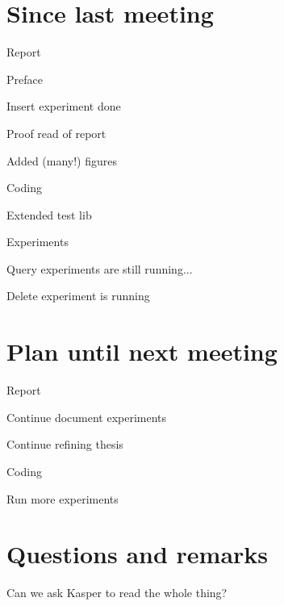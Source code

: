 \documentclass[a4paper,11pt,agenda,chair]{meetingmins}
\begin{document}
\maketitle

\section{Since last meeting}
\begin{items}
\item Report
	\begin{items}
		\item Preface
		\item Insert experiment done
		\item Proof read of report
		\item Added (many!) figures
	\end{items}
\item Coding
	\begin{items}
		\item Extended test lib
	\end{items}
\item Experiments
	\begin{items}
		\item Query experiments are still running...
		\item Delete experiment is running
	\end{items}
\end{items}

\section{Plan until next meeting}
\begin{items}
\item Report
	\begin{items}
		\item Continue document experiments
		\item Continue refining thesis
	\end{items}
\item Coding
	\begin{items}
		\item Run more experiments
	\end{items}
\end{items}

\section{Questions and remarks}
\begin{items}
	\item Can we ask Kasper to read the whole thing?
\end{items}
\end{document}
